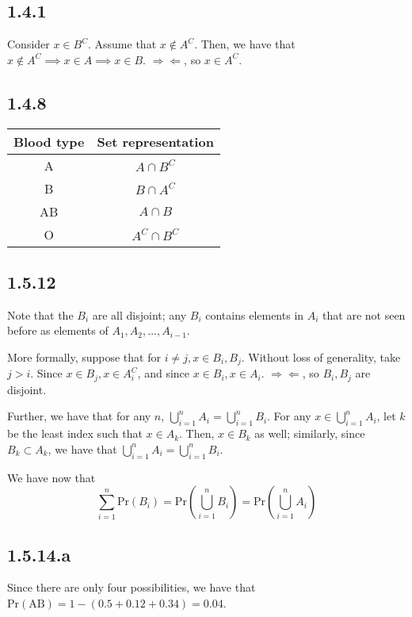 \documentclass[12pt,letterpaper]{article}
\theoremstyle{definition}
\newcommand{\contra}{\Rightarrow\!\Leftarrow}
\newcommand{\pr}[1]{\text{Pr}\left(#1\right)}
\begin{document}
\subsection*{1.4.1}
Consider $x \in B^C$. Assume that $x \notin A^C$. Then, we have that $x \notin
A^C \implies x \in A \implies x \in B$. $\contra$, so $x \in A^C$.

\subsection*{1.4.8}

\begin{center}
  \begin{tabular}{c|c}
    Blood type & Set representation \\
    \hline
    A & $A \cap B^C$ \\
    B & $B \cap A^C$ \\
    AB & $A \cap B$ \\
    O & $A^C \cap B^C$
  \end{tabular}
\end{center}

\subsection*{1.5.12}

Note that the $B_i$ are all disjoint; any $B_i$ contains elements in $A_i$ that
are not seen before as elements of $A_1, A_2, ..., A_{i-1}$.

More formally, suppose that  for $i \neq j, x \in B_i, B_j$. Without loss of generality, take
$j > i$. Since $x \in B_j, x \in A_i^C$, and since $x \in B_i, x \in A_i$.
$\contra$, so $B_i, B_j$ are disjoint.

Further, we have that for any $n$, $\bigcup_{i=1}^nA_i = \bigcup_{i=1}^nB_i$.
For any $x \in \bigcup_{i=1}^nA_i$, let $k$ be the least index such that $x \in
A_k$. Then, $x \in B_k$ as well; similarly, since $B_k \subset A_k$, we have
that $\bigcup_{i=1}^nA_i = \bigcup_{i=1}^nB_i$.

We have now that
\[
  \sum_{i=1}^n\pr{B_i} = \pr{\bigcup_{i=1}^n B_i} = \pr{\bigcup_{i=1}^n A_i}
\]

\subsection*{1.5.14.a}

Since there are only four possibilities, we have that $\pr{\text{AB}} = 1 - (0.5
+ 0.12 + 0.34) = 0.04$.
\end{document}
